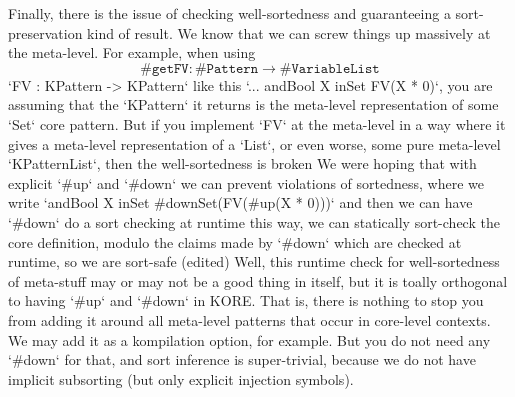 \documentclass[UTF8,11pt]{article}
\theoremstyle{plain}
\theoremstyle{definition}
\theoremstyle{remark}
\newcommand{\sharpsymbol}{\#}
\newcommand{\KVariableList}{\texttt{\sharpsymbol VariableList}}
\newcommand{\KPattern}{\texttt{\sharpsymbol Pattern}}
\newcommand{\KgetFV}{\texttt{\sharpsymbol getFV}}
\newcommand{\slashsymbol}{\symbol{92}}
\newcommand{\slsh}[1]{\texttt{\slashsymbol#1}}
\newcommand{\sland}{\slsh{and}}
\newcommand{\slor}{\slsh{or}}
\newcommand{\slnot}{\slsh{not}}
\newcommand{\slimplies}{\slsh{implies}}
\newcommand{\sliff}{\slsh{iff}}
\newcommand{\slequals}{\slsh{equals}}
\newcommand{\slexists}{\slsh{exists}}
\newcommand{\slforall}{\slsh{forall}}
\newcommand{\sltop}{\slsh{top}}
\newcommand{\slbottom}{\slsh{bottom}}
\newcommand{\slceil}{\slsh{ceil}}
\newcommand{\slfloor}{\slsh{floor}}
\newcommand{\slin}{\slsh{in}}
\begin{document}
Finally, 
there is the issue of checking well-sortedness and guaranteeing a 
sort-preservation kind of result.
We know that we can screw things up massively at the meta-level.
For example, when using
$$\KgetFV \colon \KPattern \to \KVariableList$$
`FV : KPattern -> KPattern` like 
this `... andBool X inSet FV(X * 0)`, you are assuming that the `KPattern` it 
returns is the meta-level representation of some `Set` core pattern.
But if you implement `FV` at the meta-level in a way where it gives a 
meta-level representation of a `List`, or even worse, some pure meta-level 
`KPatternList`, then the well-sortedness is broken
We were hoping that with explicit `\sharpsymbol up` and `\sharpsymbol down` we 
can prevent violations of sortedness, where we write
`andBool X inSet \sharpsymbol down{Set}(FV(\sharpsymbol up(X * 0)))`
and then we can have `\sharpsymbol down` do a sort checking at runtime
this way, we can statically sort-check the core definition, modulo the claims 
made by `\sharpsymbol down` which are checked at runtime, so we are sort-safe 
(edited)
Well, this runtime check for well-sortedness of meta-stuff may or may not be a 
good thing in itself, but it is toally orthogonal to having `\sharpsymbol up` 
and `\sharpsymbol down` in KORE.  That is, there is nothing to stop you from 
adding it around all meta-level patterns that occur in core-level contexts.  We 
may add it as a kompilation option, for example.  But you do not need any 
`\sharpsymbol down` for that, and sort inference is super-trivial, because we 
do not have implicit subsorting (but only explicit injection symbols).

%
%
%
\end{document}
